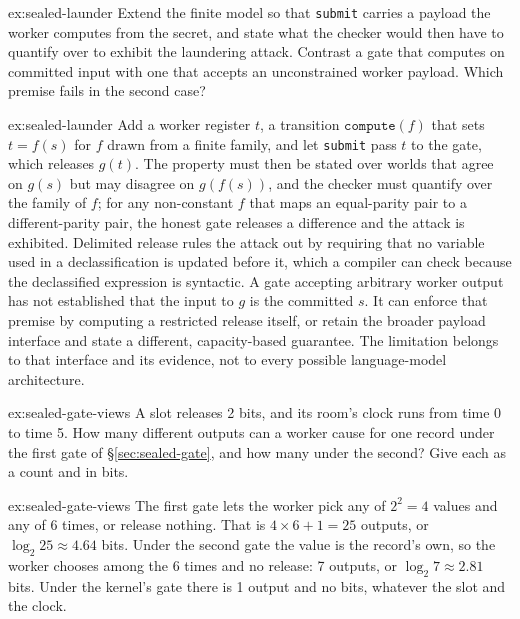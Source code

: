 \documentclass[11pt,a4paper]{article}
\theoremstyle{definition}
\begin{document}
\begin{pdexercise}[kind=Open,rating=3]{ex:sealed-launder}
Extend the finite model so that \texttt{submit} carries a payload the worker
computes from the secret, and state what the checker would then have to
quantify over to exhibit the laundering attack. Contrast a gate that computes on committed input with one that accepts an
unconstrained worker payload. Which premise fails in the second case?
\end{pdexercise}
\begin{pdsolution}{ex:sealed-launder}
Add a worker register $t$, a transition $\mathtt{compute}(f)$ that sets
$t=f(s)$ for $f$ drawn from a finite family, and let \texttt{submit} pass $t$
to the gate, which releases $g(t)$. The property must then be stated over
worlds that agree on $g(s)$ but may disagree on $g(f(s))$, and the checker must
quantify over the family of $f$; for any non-constant $f$ that maps an
equal-parity pair to a different-parity pair, the honest gate releases a
difference and the attack is exhibited. Delimited release rules the attack out
by requiring that no variable used in a declassification is updated before it,
which a compiler can check because the declassified expression is syntactic.
A gate accepting arbitrary worker output has not established that the input
to $g$ is the committed $s$. It can enforce that premise by computing a
restricted release itself, or retain the broader payload interface and state
a different, capacity-based guarantee. The limitation belongs to that
interface and its evidence, not to every possible language-model architecture.
\end{pdsolution}

\begin{pdexercise}[kind=Check,rating=1]{ex:sealed-gate-views}
A slot releases 2 bits, and its room's clock runs from time 0 to time 5.
How many different outputs can a worker cause for one record under the
first gate of \S\ref{sec:sealed-gate}, and how many under the second?
Give each as a count and in bits.
\end{pdexercise}
\begin{pdsolution}{ex:sealed-gate-views}
The first gate lets the worker pick any of $2^2=4$ values and any of 6
times, or release nothing. That is $4\times6+1=25$ outputs, or
$\log_2 25\approx4.64$ bits. Under the second gate the value is the
record's own, so the worker chooses among the 6 times and no release:
7 outputs, or $\log_2 7\approx2.81$ bits. Under the kernel's gate there is
1 output and no bits, whatever the slot and the clock.
\end{pdsolution}
\end{document}
